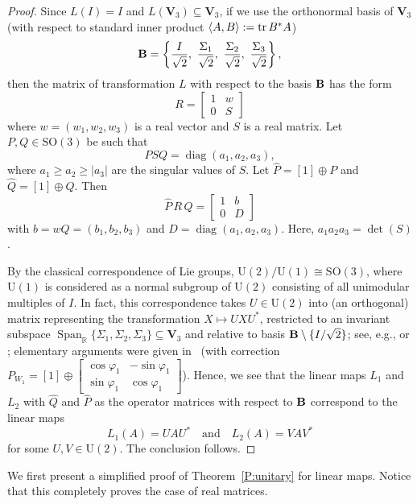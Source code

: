 \documentclass[11pt]{article}
\numberwithin{equation}{section}
\def\IR{{\mathbb R}}
\def\bV{{\mathbf V}}
\def\tr{\mathop{\rm tr}}
\def\span{{\mathop{\mathrm{Span}}\nolimits}}
\def\bV{{\mathbf V}}
\begin{document}
\begin{proof}
Since $L(I) = I$ and $L(\bV_3) \subseteq \bV_3$, if we use the orthonormal
basis of $\bV_3$ (with respect to standard inner product $\langle A,B\rangle:=\tr B^\ast A$)
\[
{\bf B} = \left\{\frac{I}{\sqrt{2}},\ \frac{\Sigma_1}{\sqrt{2}},\ \frac{\Sigma_2}{\sqrt{2}},\ \frac{\Sigma_3}{\sqrt{2}}\right\},\]
then the matrix of transformation  $L$ with respect to the basis $\bf B$ has the form
\[
R =
\begin{bmatrix}
1 &  w \\
0 & S
\end{bmatrix}
\]
where $w = (w_1, w_2, w_3)$ is a real vector and $S$ is a real matrix.
Let $P, Q \in \mathrm{SO}(3)$ be such that
\[
P S Q = \operatorname{diag}(a_1, a_2, a_3),
\]
where
$a_1 \ge a_2 \ge |a_3|$ are the singular values of $S$.
Let $\hat{P} = [1] \oplus P$ and $\hat{Q} = [1] \oplus Q$. Then
\[
\hat{P} \, R \, \hat{Q} =
\begin{bmatrix}
1 &  b \\
0 & D
\end{bmatrix}
\]
with $b = w Q = (b_1, b_2, b_3)$ and $D = \operatorname{diag}(a_1, a_2, a_3)$.
Here, $a_1 a_2 a_3 = \det(S)$.

By the classical correspondence of Lie groups,  $\mathrm{U}(2) / \mathrm{U}(1)  \cong \mathrm{SO}(3)$, where $\mathrm{U}(1)$ is considered  as a normal subgroup of $\mathrm{U}(2)$ consisting of all unimodular multiples of $I$. In fact, this correspondence takes $U\in \mathrm{U}(2)$ into (an orthogonal) matrix representing the  transformation $X\mapsto UXU^\ast$, restricted to an invariant subspace $\span_{\IR}\{\Sigma_1,\Sigma_2,\Sigma_3\}\subseteq\bV_3$ and relative to basis ${\bf B}\setminus\{I/\sqrt{2}\}$; see, e.g., \cite[Exercise B.4]{AubrunSzarek2017} or \cite[p.~54]{CarterSegalMacdonald};
elementary arguments were given in~\cite[Proposition 4.3]{Li-Tsai-Wang-Wong} (with correction $P_{W_1} = [1] \oplus\left[
\begin{smallmatrix}
\cos\varphi_1 & -\sin\varphi_1 \\
\sin\varphi_1 & \cos\varphi_1
\end{smallmatrix}\right]$).
Hence, we see that the
linear maps $L_1$ and $L_2$
 with $\hat{Q}$ and $\hat{P}$ as the operator matrices with respect to $\bf B$
correspond to the linear maps
\[
L_1(A) = U A U^* \quad\text{and}\quad L_2(A) = V A V^*
\]
for some $U, V \in \mathrm{U}(2)$. The conclusion follows.
\end{proof}


We first present a simplified proof of Theorem~\ref{P:unitary} for linear maps. Notice that this completely proves the case of real matrices.
\end{document}
